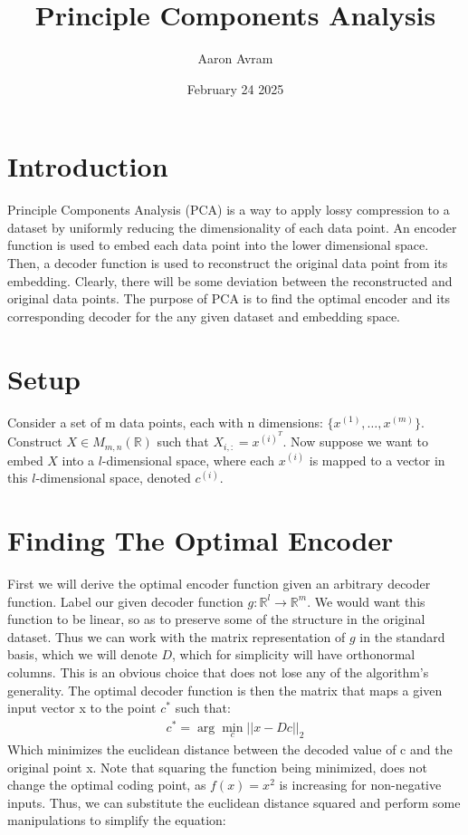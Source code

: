 \documentclass[12pt]{article}
\title{Principle Components Analysis}
\author{Aaron Avram}
\date{February 24 2025}
\begin{document}
\maketitle

\section*{Introduction}
Principle Components Analysis (PCA) is a way to apply lossy compression to a dataset by uniformly reducing the dimensionality of each data point. An encoder function is used to embed each data point into the lower dimensional space. Then, a decoder function is used to reconstruct the original data point from its embedding. Clearly, there will be some deviation  between the reconstructed and original data points. The purpose of PCA is to find the optimal encoder and its corresponding decoder for the any given dataset and embedding space.

\section*{Setup}
Consider a set of m data points, each with n dimensions: $\{x^{(1)}, \ldots, x^{(m)} \}$. Construct $X \in  M_{m,n}(\mathbb{R})$ such that $X_{i,:} = x^{(i)^T}$. Now suppose we want to embed $X$ into a $l$-dimensional space, where each $x^{(i)}$ is mapped to a vector in this $l$-dimensional space, denoted $c^{(i)}$.

\section*{Finding The Optimal Encoder}
First we will derive the optimal encoder function given an arbitrary decoder function.
Label our given decoder function $g: \mathbb{R}^l \to \mathbb{R}^m$. We would want this function to be linear, so as to preserve some of the structure in the original dataset. Thus we can work with the matrix representation of $g$ in the standard basis, which we will denote $D$, which for simplicity will have orthonormal columns. This is an obvious choice that does not lose any of the algorithm's generality. The optimal decoder function is then the matrix that maps a given input vector x to the point $c^*$ such that:
\begin{align*}
    c^*= \displaystyle \arg \min_c || x - Dc||_2
\end{align*}
Which minimizes the euclidean distance between the decoded value of c and the original point x. Note that squaring the function being minimized, does not change the optimal coding point, as $f(x) = x^2$ is increasing for non-negative inputs. Thus, we can substitute the euclidean distance squared and perform some manipulations to simplify the equation:
\end{document}
